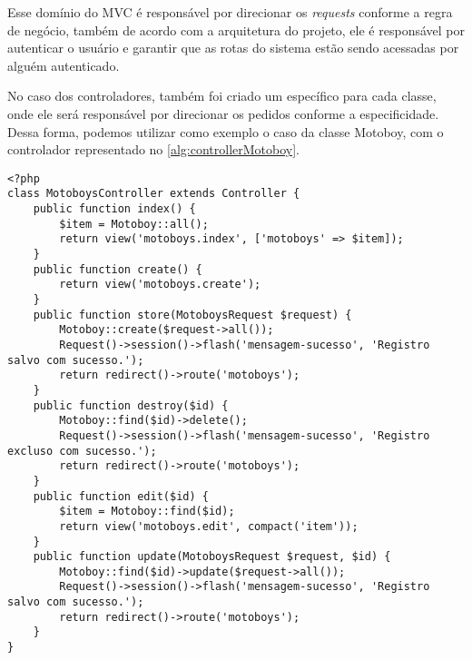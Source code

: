 Esse domínio do MVC é responsável por direcionar os \textit{requests} conforme a regra de negócio, também de acordo com a arquitetura do projeto, ele é responsável por autenticar o usuário e garantir que as rotas do sistema estão sendo acessadas por alguém autenticado. 

No caso dos controladores, também foi criado um específico para cada classe, onde ele será responsável por direcionar os pedidos conforme a especificidade. Dessa forma, podemos utilizar como exemplo o caso da classe Motoboy, com o controlador representado no \autoref{alg:controllerMotoboy}.

\begin{lstlisting}[caption={Delivery Routes - Exemplo de um Controller: Motoboy}, style=htmlcssjs, label=alg:controllerMotoboy]
<?php
class MotoboysController extends Controller {
    public function index() {
        $item = Motoboy::all();
        return view('motoboys.index', ['motoboys' => $item]);
    }
    public function create() {
        return view('motoboys.create');
    }
    public function store(MotoboysRequest $request) {
        Motoboy::create($request->all());
        Request()->session()->flash('mensagem-sucesso', 'Registro salvo com sucesso.');
        return redirect()->route('motoboys');
    }
    public function destroy($id) {
        Motoboy::find($id)->delete();
        Request()->session()->flash('mensagem-sucesso', 'Registro excluso com sucesso.');
        return redirect()->route('motoboys');
    }
    public function edit($id) {
        $item = Motoboy::find($id);
        return view('motoboys.edit', compact('item'));
    }
    public function update(MotoboysRequest $request, $id) {
        Motoboy::find($id)->update($request->all());
        Request()->session()->flash('mensagem-sucesso', 'Registro salvo com sucesso.');
        return redirect()->route('motoboys');
    }
}
\end{lstlisting}

